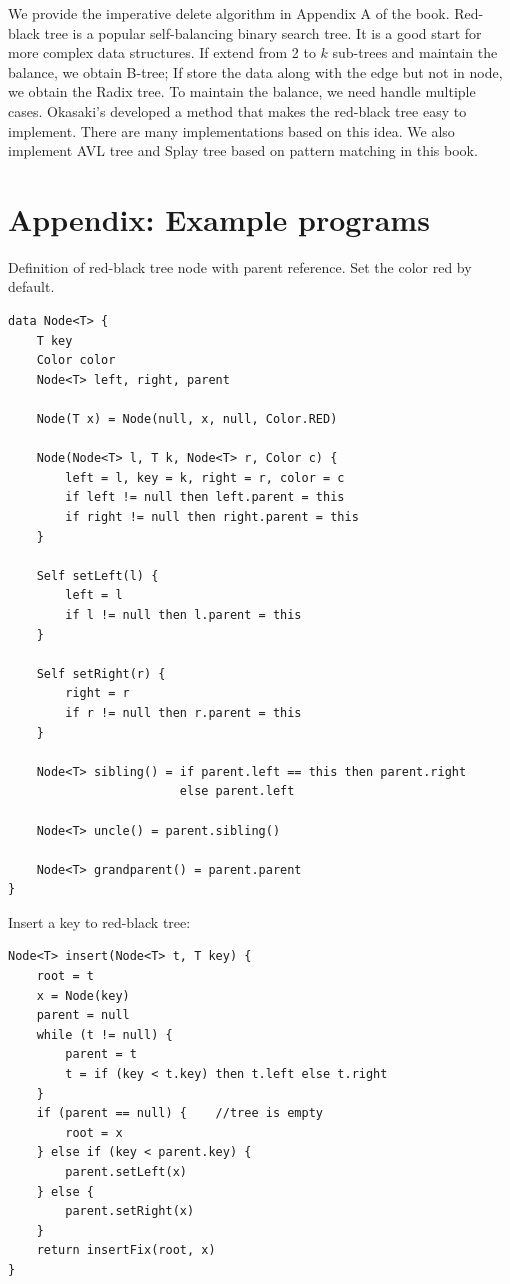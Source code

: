 \documentclass[b5paper]{article}
\begin{document}
We provide the imperative delete algorithm in Appendix A of the book. Red-black tree is a popular self-balancing binary search tree. It is a good start for more complex data structures. If extend from 2 to $k$ sub-trees and maintain the balance, we obtain B-tree; If store the data along with the edge but not in node, we obtain the Radix tree. To maintain the balance, we need handle multiple cases. Okasaki's developed a method that makes the red-black tree easy to implement. There are many implementations based on this idea\cite{rosetta}. We also implement AVL tree and Splay tree based on pattern matching in this book.

\section{Appendix: Example programs}

Definition of red-black tree node with parent reference. Set the color red by default.

\begin{lstlisting}[language = Bourbaki]
data Node<T> {
    T key
    Color color
    Node<T> left, right, parent

    Node(T x) = Node(null, x, null, Color.RED)

    Node(Node<T> l, T k, Node<T> r, Color c) {
        left = l, key = k, right = r, color = c
        if left != null then left.parent = this
        if right != null then right.parent = this
    }

    Self setLeft(l) {
        left = l
        if l != null then l.parent = this
    }

    Self setRight(r) {
        right = r
        if r != null then r.parent = this
    }

    Node<T> sibling() = if parent.left == this then parent.right
                        else parent.left

    Node<T> uncle() = parent.sibling()

    Node<T> grandparent() = parent.parent
}
\end{lstlisting}

Insert a key to red-black tree:

\begin{lstlisting}[language = Bourbaki]
Node<T> insert(Node<T> t, T key) {
    root = t
    x = Node(key)
    parent = null
    while (t != null) {
        parent = t
        t = if (key < t.key) then t.left else t.right
    }
    if (parent == null) {    //tree is empty
        root = x
    } else if (key < parent.key) {
        parent.setLeft(x)
    } else {
        parent.setRight(x)
    }
    return insertFix(root, x)
}
\end{lstlisting}
\end{document}
